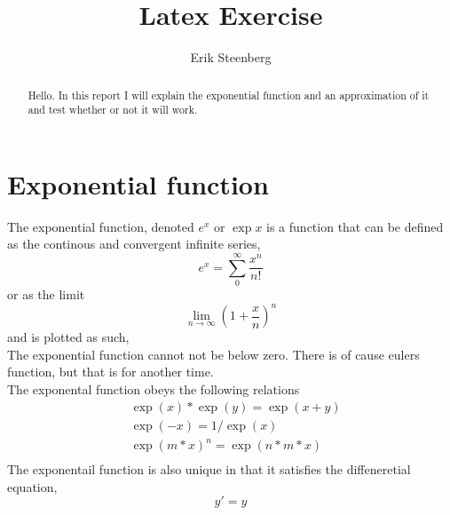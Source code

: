 \documentclass{article}
\title{Latex Exercise}
\date{}
\author{Erik Steenberg}
\begin{document}
\maketitle
\begin{abstract}
Hello. In this report I will explain the exponential function and an approximation of it and test whether or not it will work.
\end{abstract}
\section{Exponential function}
The exponential function, denoted $e^{x}$ or $\exp{x}$ is a function that can be defined as the continous and convergent infinite series,
\begin{equation}\label{eq:exp}
	e^{x}= \sum_0^\infty \frac{x^n}{n!}
\end{equation}
or as the limit
\begin{equation}
	\lim_{n \to \infty} \left(1 + \frac{x}{n}\right)^n
\end{equation}
and is plotted as such,
%	
\\
The exponential function cannot not be below zero. There is of cause eulers function, but that is for another time. 
\\
The exponental function obeys the following relations
\begin{align}\label{eq:rel}
	&\exp(x)*\exp(y) = \exp(x+y)\\
	&\exp(-x)=1/\exp(x)\\
	&\exp(m*x)^n=\exp(n*m*x)\\
\end{align}
The exponentail function is also unique in that it satisfies the diffeneretial equation,
\begin{equation}
	y' = y
\end{equation}
\end{document}
